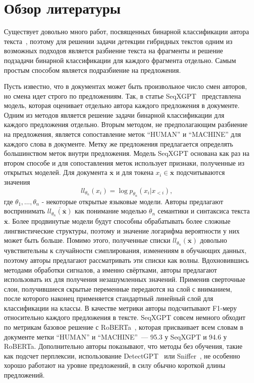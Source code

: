 \section{Обзор литературы}

Существует довольно много работ, посвященных бинарной классификации автора текста~\cite{uchendu-etal-2020-authorship, uchendu-etal-2021-turingbench-benchmark, macko-etal-2023-multitude}, поэтому для решении задачи детекции гибридных текстов одним из возможных подходов является разбиение текста на фрагменты и решение подзадачи бинарной классификации для каждого фрагмента отдельно. Самым простым способом является подразбиение на предложения. 

Пусть известно, что в документах может быть произвольное число смен авторов, но смена идет строго по предложениям. Так, в статье SeqXGPT~\cite{wang-etal-2023-seqxgpt} представлена модель, которая оценивает отдельно автора каждого предложения в документе. Одним из методов является решение задачи бинарной классификации для каждого предложения отдельно. Вторым методом, не предполагающим разбиение на предложения, является сопоставление меток ``HUMAN'' и ``MACHINE'' для каждого слова в документе. Метку же предложения предлагается определять большинством меток внутри предложения. Модель SeqXGPT основана как раз на втором способе и для сопоставления меток использует признаки, полученные из открытых моделей. Для документа $\overline{\mathbf{x}}$ и для токена $x_i \in \overline{\mathbf{x}}$ подсчитываются значения $$ll_{\theta_n}(x_i) = \log p_{\theta_n}(x_i | x_{<i}),$$ где $\theta_1, \dots, \theta_n$ - некоторые открытые языковые модели. Авторы предлагают воспринимать $\overline{ll_{\theta_n}(\overline{\mathbf{x}})}$ как понимание моделью $\theta_n$ семантики и синтаксиса текста $\overline{\mathbf{x}}$. Более продвинутые модели будут способны обрабатывать более сложные лингвистические структуры, поэтому и значение логарифма вероятности у них может быть больше. Помимо этого, полученные списки $ll_{\theta_n}(\overline{\mathbf{x}})$ довольно чувствительны к случайности сэмплирования, изменениям в обучающих данных, поэтому авторы предлагают рассматривать эти списки как волны. Вдохновившись методами обработки сигналов, а именно свёртками, авторы предлагают использовать их для получения незашумленных значений. Применив сверточные слои, получившиеся скрытые переменные передаются на слой с вниманием, после которого наконец применяется стандартный линейный слой для классификации на классы. В качестве метрики авторы подсчитывают F1-меру относительно каждого предложения в тексте. SeqXGPT совсем немного обходит по метрикам базовое решение с RoBERTa~\cite{roberta}, которая присваивает всем словам в документе метки ``HUMAN'' и ``MACHINE''~--- 95.3 у SeqXGPT и 94.6 у RoBERTa. Дополнительно авторы показывают, что методы без обучения, такие как подсчет перплексии, использование DetectGPT~\cite{mitchell2023detectgpt} или Sniffer~\cite{li2023origin}, не особенно хорошо работают на уровне предложений, в силу обычно короткой длины предложений.

